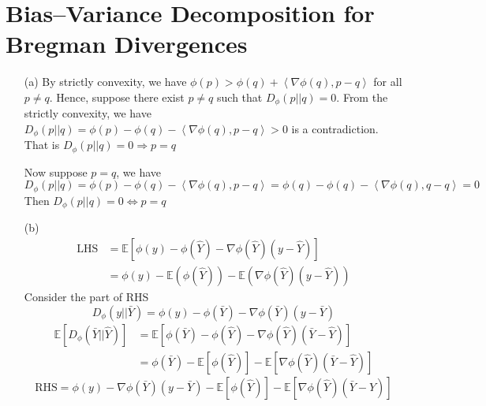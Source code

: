 \documentclass[12pt,a4paper]{article}
\begin{document}
\section{Bias–Variance Decomposition for Bregman Divergences}

\begin{enumerate}
    \item[(a)] 
        By strictly convexity, we have $\phi(p) > \phi(q) + \left\langle \nabla\phi(q), p-q\right\rangle  $ for all $p\neq q$. Hence, suppose there exist $p\neq q$ such that $D_{\phi}(p||q) = 0$.
        From the strictly convexity, we have $D_{\phi}(p||q) = \phi(p) - \phi(q) - \left\langle \nabla\phi(q), p-q\right\rangle > 0$ is a contradiction. That is $D_{\phi}(p||q) = 0 \Rightarrow p = q$

        Now suppose $p=q$, we have $$D_{\phi}(p||q) = \phi(p) - \phi(q) - \left\langle \nabla\phi(q), p-q\right\rangle = \phi(q) - \phi(q) - \left\langle \nabla\phi(q), q-q\right\rangle=0$$
        Then $D_{\phi}(p||q) = 0 \Leftrightarrow p = q$
    \item[(b)]
        \begin{equation*}
            \begin{split}
                \text{LHS} 
                    &= \mathbb{E} [\phi(y) - \phi(\hat{Y}) - \nabla\phi(\hat{Y})(y-\hat{Y})] \\
                    &= \phi(y) - \mathbb{E} (\phi(\hat{Y})) - \mathbb{E} (\nabla\phi(\hat{Y})(y-\hat{Y}))
            \end{split}
        \end{equation*}    
        Consider the part of RHS
        \begin{equation*}
            D_{\phi}(y||\bar{Y}) = \phi(y) - \phi(\bar{Y}) - \nabla\phi(\bar{Y})(y-\bar{Y})
        \end{equation*}
        \begin{equation*}
            \begin{split}
                \mathbb{E}[D_{\phi}(\bar{Y}||\hat{Y})] 
                    &= \mathbb{E}[\phi(\bar{Y})-\phi(\hat{Y})-\nabla\phi(\hat{Y})(\bar{Y}-\hat{Y})]\\
                    &= \phi(\bar{Y}) - \mathbb{E}[\phi(\hat{Y})] - \mathbb{E}[\nabla\phi(\hat{Y})(\bar{Y}-\hat{Y})]
            \end{split}
        \end{equation*}
        \begin{equation*}
            \text{RHS} = \phi(y) - \nabla\phi(\bar{Y})(y-\bar{Y}) - \mathbb{E}[\phi(\hat{Y})] - \mathbb{E}[\nabla\phi(\hat{Y})(\bar{Y}-\hat{Y})]

\end{equation*}
\end{enumerate}
\end{document}

